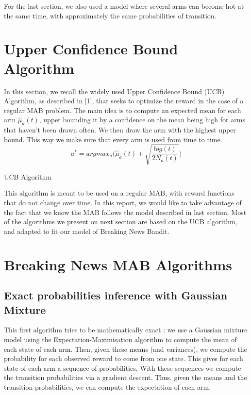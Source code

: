 \documentclass{article} %
\begin{document}
For the last section, we also used a model where several arms can become hot at the same time, with approximately the same probabilities of transition.

\section{Upper Confidence Bound Algorithm}

In this section, we recall the widely used Upper Confidence Bound (UCB) Algorithm,
as described in [1],
that seeks to optimize the reward in the case of a regular MAB problem. The main
idea is to compute an expected mean for each arm $\hat\mu_a(t)$, upper bounding it
by a confidence on the mean being high for arms that haven't been drawn often. We
then draw the arm with the highest upper bound.
This way we make sure that every arm is used from time to time.
\begin{equation*}
	a^* = argmax_{a} \Big(\hat\mu_a(t) + \sqrt{\frac{log(t)}{2N_a(t)}}\Big)
\end{equation*}

\begin{algorithm}
	\caption{UCB Algorithm}
\end{algorithm}

This algorithm is meant to be used on a regular MAB, with reward functions that do not
change over time. In this report, we would like to take advantage of the fact that
we know the MAB follows the model described in last section. Most of the algorithms
we present on next section are based on the UCB algorithm, and adapted to fit our model
of Breaking News Bandit.


\section{Breaking News MAB Algorithms}
\subsection{Exact probabilities inference with Gaussian Mixture}

This first algorithm tries to be mathematically exact : we use a Gaussian mixture model using the Expectation-Maximisation algorithm to compute the mean of each state of each arm. Then, given these means (and variances), we compute the probability for each observed reward to come from one state. This gives for each state of each arm a sequence of probabilities. With these sequences we compute the transition probabilities via a gradient descent. Thus, given the means and the transition probabilities, we can compute the expectation of each arm.
\newline
\end{document}

